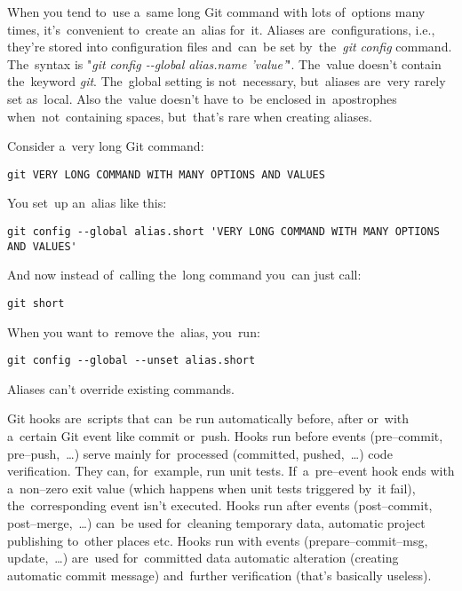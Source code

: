 


When you tend to~use a~same long Git command with lots of~options many times, it's~convenient to~create an~alias for~it. Aliases are~configurations, i.e., they're stored into configuration files and~can~be set by~the~\textit{git config} command. The~syntax is "\textit{git config \mbox{-{}-global} alias.name 'value'}". The~value doesn't contain the~keyword \textit{git}. The~global setting is not~necessary, but~aliases are~very rarely set as~local. Also the~value doesn't have to~be enclosed in~apostrophes when~not~containing spaces, but~that's rare when creating aliases.

\example
\noindent Consider a~very long Git command:
\begin{lstlisting}[frame=no]
    git VERY LONG COMMAND WITH MANY OPTIONS AND VALUES
\end{lstlisting}
\noindent You set~up an~alias like this:
\begin{lstlisting}[frame=no]
    git config --global alias.short 'VERY LONG COMMAND WITH MANY OPTIONS AND VALUES'
\end{lstlisting}
\noindent And now instead of~calling the~long command you~can just call:
\begin{lstlisting}[frame=no]
    git short
\end{lstlisting}
\noindent When you want to~remove the~alias, you~run:
\begin{lstlisting}[frame=no]
    git config --global --unset alias.short
\end{lstlisting}

\warning Aliases can't override existing commands.

Git hooks are~scripts that can~be run automatically before, after or~with a~certain Git event like commit or~push. Hooks run before events (pre--commit, pre--push,~\dots) serve mainly for~processed (committed, pushed,~\dots) code verification. They can, for~example, run unit tests. If~a~pre--event hook ends with a~non--zero exit value (which happens when unit tests triggered by~it fail), the~corresponding event isn't executed. Hooks run after events (post--commit, post--merge,~\dots) can~be used for~cleaning temporary data, automatic project publishing to~other places etc. Hooks run with events (prepare--commit--msg, update,~\dots) are~used for~committed data automatic alteration (creating automatic commit message) and~further verification (that's basically useless).

